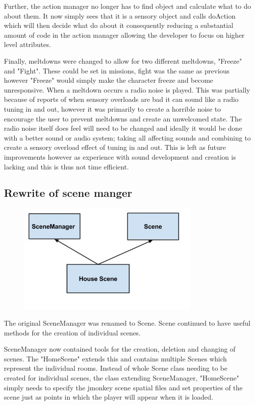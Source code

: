 \documentclass[11pt]{report}
\begin{document}
Further, the action manager no longer has to find object and calculate what to do about them. It now simply sees that it is a sensory object and calls doAction which will then decide what do about it consequently reducing a substantial amount of code in the action manager allowing the developer to focus on higher level attributes. 

Finally, meltdowns were changed to allow for two different meltdowns, "Freeze" and "Fight". These could be set in missions, fight was the same as previous however "Freeze" would simply make the character freeze and become unresponsive. When a meltdown occurs a radio noise is played. This was partially because of reports of when sensory overloads are bad it can sound like a radio tuning in and out, however it was primarily to create a horrible noise to encourage the user to prevent meltdowns and create an unwelcomed state. The radio noise itself does feel will need to be changed and ideally it would be done with a better sound or audio system; taking all affecting sounds and combining to create a sensory overload effect of tuning in and out. This is left as future improvements however as experience with sound development and creation is lacking and this is thus not time efficient. 

\subsection{Rewrite of scene manger}

\begin{figure}[H]
\centering
\includegraphics[width=90mm]{images/scenemanager.jpg}
\caption{}
\label{scenemanager}
\end{figure}

The original SceneManager was renamed to Scene. Scene continued to have useful methods for the creation of individual scenes. 

SceneManager now contained tools for the creation, deletion and changing of scenes. The "HomeScene" extends this and contains multiple Scenes which represent the individual rooms. Instead of whole Scene class needing to be created for individual scenes, the class extending SceneManager, "HomeScene" simply needs to specify the jmonkey scene spatial files and set properties of the scene just as points in which the player will appear when it is loaded. 
\end{document}

